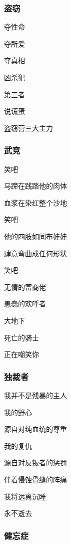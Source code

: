 \documentclass[openany,scheme = chinese, linespread = 1.5]{ctexbook}
\begin{document}
\subsubsection*{盗窃}

\begin{center}
夺性命

夺所爱

夺真相

凶杀犯

第三者

说谎蛋

盗窃营三大主力
\end{center}

\subsubsection*{武竞}

\begin{center}
笑吧

马蹄在践踏他的肉体

血浆在染红整个沙地

笑吧

他的四肢如同布娃娃

肆意弯曲成任何形状

笑吧

无情的富商佬

愚蠢的欢呼者

大地下

死亡的骑士

正在嘲笑你
\end{center}

\subsubsection*{独裁者}

\begin{center}
我并不是残暴的主人

我的野心

源自对纯血统的尊重

我的复仇

源自对反叛者的惩罚

伴着侵蚀骨缝的阵痛

我将远离沉睡

永不逝去
\end{center}

\subsubsection*{健忘症}
\end{document}
